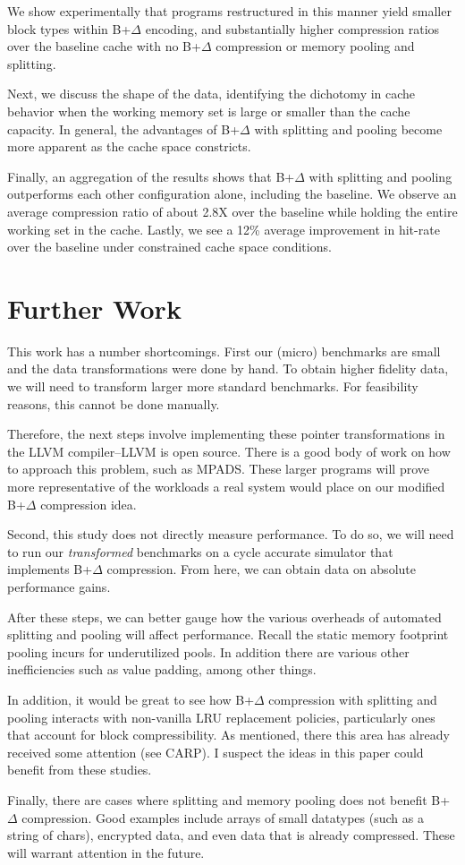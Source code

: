 \documentclass[pageno]{jpaper}
\begin{document}
We show experimentally that programs restructured in this manner yield smaller block types within B+$\Delta$ encoding, and substantially higher compression ratios over the baseline cache with no B+$\Delta$ compression or memory pooling and splitting.

 Next, we discuss the shape of the data, identifying the dichotomy in cache behavior when the working memory set is large or smaller than the cache capacity. In general, the advantages of B+$\Delta$ with splitting and pooling become more apparent as the cache space constricts.

Finally, an aggregation of the results shows that B+$\Delta$ with splitting and pooling outperforms each other configuration alone, including the baseline. We observe an average compression ratio of about 2.8X over the baseline while holding the entire working set in the cache. Lastly, we see a 12\% average improvement in hit-rate over the baseline under constrained cache space conditions.


\section{Further Work}
This work has a number shortcomings. First our (micro) benchmarks are small and the data transformations were done by hand. To obtain higher fidelity data, we will need to transform larger more standard benchmarks. For feasibility reasons, this cannot be done manually.

Therefore, the next steps involve implementing these pointer transformations in the LLVM compiler--LLVM is open source. There is a good body of work on how to approach this problem, such as MPADS\cite{mpads}. These larger programs will prove more representative of the workloads a real system would place on our modified B+$\Delta$ compression idea.

Second, this study does not directly measure performance. To do so, we will need to run our \textit{transformed} benchmarks on a cycle accurate simulator that implements B+$\Delta$ compression. From here, we can obtain data on absolute performance gains.

After these steps, we can better gauge how the various overheads of automated splitting and pooling will affect performance. Recall the static memory footprint pooling incurs for underutilized pools. In addition there are various other inefficiencies such as value padding, among other things.

In addition, it would be great to see how B+$\Delta$ compression with splitting and pooling interacts with non-vanilla LRU replacement policies, particularly ones that account for block compressibility. As mentioned, there this area has already received some attention (see CARP\cite{carp}). I suspect the ideas in this paper could benefit  from these studies.

Finally, there are cases where splitting and memory pooling does not benefit B+$\Delta$ compression. Good examples include arrays of small datatypes (such as a string of chars), encrypted data, and even data that is already compressed. These will warrant attention in the future.



\end{document}
